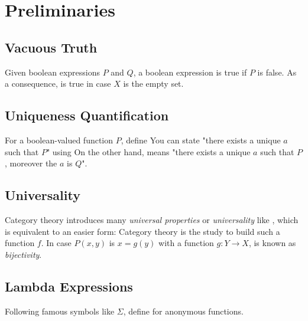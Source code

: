 \section{Preliminaries}

\subsection{Vacuous Truth}

Given boolean expressions $P$ and $Q$, a boolean expression
is true if $P$ is false.
As a consequence,
is true in case $X$ is the empty set.

\subsection{Uniqueness Quantification}

For a boolean-valued function $P$, define
You can state "there exists a unique $a$ such that $P$" using
On the other hand,
means "there exists a unique $a$ such that $P$, moreover the $a$ is $Q$".

\subsection{Universality}

Category theory introduces many \textit{universal properties} or \textit{universality} like 
, which is equivalent to an easier form:
Category theory is the study to build such a function $f$.
\mynewline
In case $P(x,y)$ is $x = g(y)$ with a function $g : Y \to X$,
is known as \textit{bijectivity}.

\subsection{Lambda Expressions}

Following famous symbols like $\Sigma$, define
for anonymous functions.

